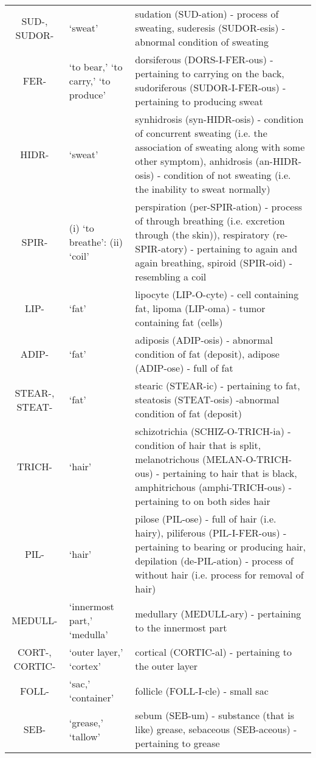 \begin{longtable}{c | p{} | p{}}
        SUD-, SUDOR- & `sweat' & sudation (SUD-ation) - process of sweating, suderesis (SUDOR-esis) - abnormal condition of sweating \\
        FER- & `to bear,' `to carry,' `to produce' & dorsiferous (DORS-I-FER-ous) - pertaining to carrying on the back, sudoriferous (SUDOR-I-FER-ous) - pertaining to producing sweat \\
        HIDR- & `sweat' & synhidrosis (syn-HIDR-osis) - condition of concurrent sweating (i.e. the association of sweating along with some other symptom), anhidrosis (an-HIDR-osis) - condition of not sweating (i.e. the inability to sweat normally) \\
        SPIR- & (i) `to breathe': (ii) `coil' & perspiration (per-SPIR-ation) - process of through breathing (i.e. excretion through (the skin)), respiratory (re-SPIR-atory) - pertaining to again and again breathing, spiroid (SPIR-oid) - resembling a coil \\
        LIP- & `fat' & lipocyte (LIP-O-cyte) - cell containing fat, lipoma (LIP-oma) - tumor containing fat (cells) \\
        ADIP- & `fat' & adiposis (ADIP-osis) - abnormal condition of fat (deposit), adipose (ADIP-ose) - full of fat \\
        STEAR-, STEAT- & `fat' & stearic (STEAR-ic) - pertaining to fat, steatosis (STEAT-osis) -abnormal condition of fat (deposit) \\
        TRICH- & `hair' & schizotrichia (SCHIZ-O-TRICH-ia) - condition of hair that is split, melanotrichous (MELAN-O-TRICH-ous) - pertaining to hair that is black, amphitrichous (amphi-TRICH-ous) - pertaining to on both sides hair \\
        PIL- & `hair' & pilose (PIL-ose) - full of hair (i.e. hairy), piliferous (PIL-I-FER-ous) - pertaining to bearing or producing hair, depilation (de-PIL-ation) - process of without hair (i.e. process for removal of hair) \\
        MEDULL- & `innermost part,' `medulla' & medullary (MEDULL-ary) - pertaining to the innermost part \\
        CORT-, CORTIC- & `outer layer,' `cortex' & cortical (CORTIC-al) - pertaining to the outer layer \\
        FOLL- & `sac,' `container' & follicle (FOLL-I-cle) - small sac \\
        SEB- & `grease,' `tallow' & sebum (SEB-um) - substance (that is like) grease, sebaceous (SEB-aceous) - pertaining to grease \\

\end{longtable}
